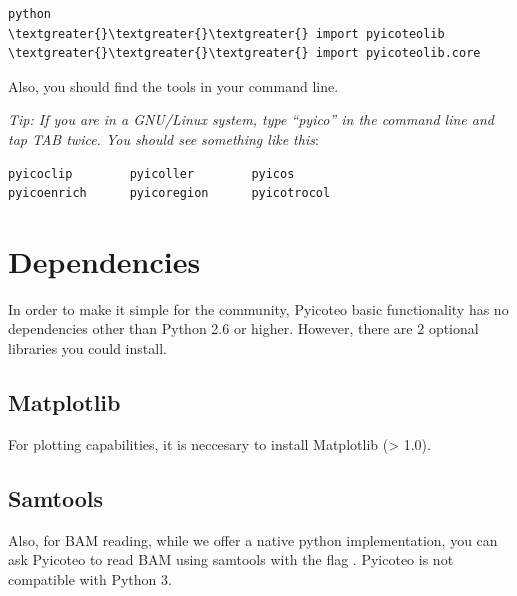 \documentclass[letterpaper,10pt,english]{sphinxmanual}
\begin{document}
\begin{Verbatim}[commandchars=\\\{\}]
python
\textgreater{}\textgreater{}\textgreater{} import pyicoteolib
\textgreater{}\textgreater{}\textgreater{} import pyicoteolib.core
\end{Verbatim}

Also, you should find the tools in your command line.

\emph{Tip: If you are in a GNU/Linux system, type ``pyico'' in the command line and tap TAB twice. You should see something like this}:

\begin{Verbatim}[commandchars=\\\{\}]
pyicoclip        pyicoller        pyicos
pyicoenrich      pyicoregion      pyicotrocol
\end{Verbatim}


\section{Dependencies}
\label{index:dependencies}
In order to make it simple for the community, Pyicoteo basic functionality has no dependencies other than Python 2.6 or higher. However, there are 2 optional libraries you could install.


\subsection{Matplotlib}
\label{index:matplotlib}
For plotting capabilities, it is neccesary to install Matplotlib (\textgreater{} 1.0).


\subsection{Samtools}
\label{index:samtools}
Also, for BAM reading, while we offer a native python implementation, you can ask Pyicoteo to read BAM using samtools with the flag .
Pyicoteo is not compatible with Python 3.
\end{document}
